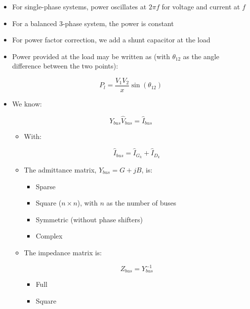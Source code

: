 \begin{itemize}

  \item For single-phase systems, power oscillates at $2\pi f$ for voltage and current at $f$

  \item For a balanced 3-phase system, the power is constant

  \item For power factor correction, we add a shunt capacitor at the load

  \item Power provided at the load may be written as (with $\theta_{12}$ as the angle difference between the two points):

    $$P_l=\frac{V_1V_2}{x}\sin\left( \theta_{12} \right)$$

  \item We know:

    $$Y_{bus}\hat{V}_{bus}=\hat{I}_{bus}$$

    \begin{itemize}

      \item With:

        $$\hat{I}_{bus}=\hat{I}_{G_k}+\hat{I}_{D_k}$$

      \item The admittance matrix, $Y_{bus}=G+jB$, is:

        \begin{itemize}

          \item Sparse

          \item Square ($n\times n$), with $n$ as the number of buses

          \item Symmetric (without phase shifters)

          \item Complex

        \end{itemize}

      \item The impedance matrix is:

        $$Z_{bus}=Y_{bus}^{-1}$$

        \begin{itemize}

          \item Full

          \item Square


\end{itemize}
\end{itemize}
\end{itemize}
